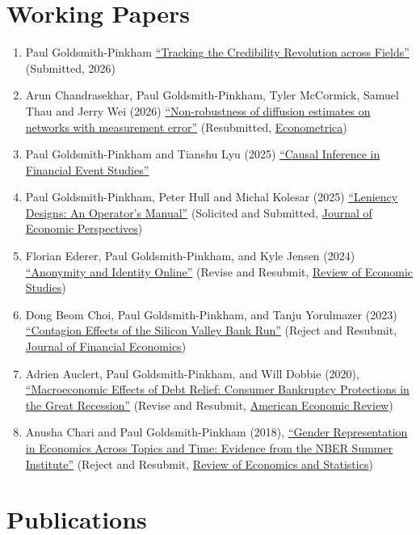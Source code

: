 \documentclass[letterpaper]{article}
\begin{document}
\section*{Working Papers}

\begin{enumerate}
	\item Paul Goldsmith-Pinkham \href{https://arxiv.org/abs/2405.20604}{``Tracking the Credibility Revolution across Fields''} (Submitted, 2026)
	\item Arun Chandrasekhar, Paul Goldsmith-Pinkham, Tyler McCormick, Samuel Thau and Jerry Wei (2026) \href{https://paulgp.github.io/papers/diffusion_error_CGPMTW.pdf}{``Non-robustness of diffusion estimates on networks with measurement error''} (Resubmitted, \ul{Econometrica})
	\item Paul Goldsmith-Pinkham and Tianshu Lyu (2025) \href{http://paulgp.github.io/papers/financial_event_studies_nov18.pdf}{``Causal Inference in Financial Event Studies''}
	\item Paul Goldsmith-Pinkham, Peter Hull and Michal Kolesar (2025) \href{https://arxiv.org/abs/2511.03572}{``Leniency Designs: An Operator's Manual''} (Solicited and Submitted, \ul{Journal of Economic Perspectives})
	\item Florian Ederer, Paul Goldsmith-Pinkham, and Kyle Jensen (2024) \href{https://florianederer.github.io/ejmr.pdf}{``Anonymity and Identity Online''}  (Revise and Resubmit, \ul{Review of Economic Studies})
	\item Dong Beom Choi, Paul Goldsmith-Pinkham, and Tanju Yorulmazer (2023) \href{https://arxiv.org/pdf/2308.06642.pdf}{``Contagion Effects of the Silicon Valley Bank Run''}  (Reject and Resubmit, \ul{Journal of Financial Economics})
	\item Adrien Auclert, Paul Goldsmith-Pinkham, and Will Dobbie (2020), \href{http://paulgp.github.io/papers/Macroeconomic_Effects_of_Debt_Relief_Posting_342019.pdf}{``Macroeconomic Effects of Debt Relief: Consumer Bankruptcy Protections in the Great Recession''} (Revise and Resubmit, \ul{American Economic Review})
	\item Anusha Chari and  Paul Goldsmith-Pinkham (2018), \href{http://paulgp.github.io/papers/cgp_nbergender.pdf}{``Gender Representation in Economics Across Topics and Time: Evidence from the NBER Summer Institute''} (Reject and Resubmit, \ul{Review of Economics and Statistics})
\end{enumerate}

\section*{Publications}
\end{document}
